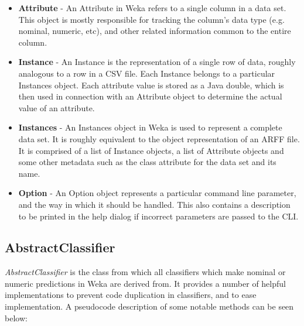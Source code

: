 \begin{itemize}
\item \textbf{Attribute} - An Attribute in Weka refers to a single column in a data set. This object is mostly responsible for tracking the column's data type (e.g. nominal, numeric, etc), and other related information common to the entire column.
\item \textbf{Instance} - An Instance is the representation of a single row of data, roughly analogous to a row in a CSV file. Each Instance belongs to a particular Instances object. Each attribute value is stored as a Java double, which is then used in connection with an Attribute object to determine the actual value of an attribute.
\item \textbf{Instances} - An Instances object in Weka is used to represent a complete data set. It is roughly equivalent to the object representation of an ARFF file. It is comprised of a list of Instance objects,  a list of Attribute objects and some other metadata such as the class attribute for the data set and its name.
\item \textbf{Option} - An Option object represents a particular command line parameter, and the way in which it should be handled. This also contains a description to be printed in the help dialog if incorrect parameters are passed to the CLI.
\end{itemize}

\subsection{AbstractClassifier}
\textit{AbstractClassifier} is the class from which all classifiers which make nominal or numeric predictions in Weka are derived from. It provides a number of helpful implementations to prevent code duplication in classifiers, and to ease implementation. A pseudocode description of some notable methods can be seen below:

